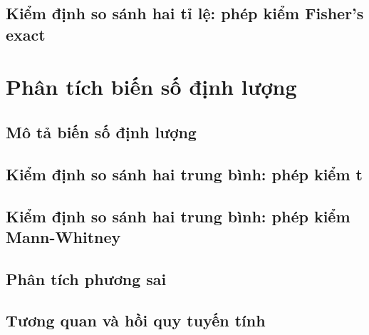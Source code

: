 \documentclass[
]{book}
\begin{document}
\hypertarget{kiux1ec3m-ux111ux1ecbnh-so-suxe1nh-hai-tux1ec9-lux1ec7-phuxe9p-kiux1ec3m-fishers-exact}{%
\subsection{Kiểm định so sánh hai tỉ lệ: phép kiểm Fisher's exact}\label{kiux1ec3m-ux111ux1ecbnh-so-suxe1nh-hai-tux1ec9-lux1ec7-phuxe9p-kiux1ec3m-fishers-exact}}

\hypertarget{phuxe2n-tuxedch-biux1ebfn-sux1ed1-ux111ux1ecbnh-lux1b0ux1ee3ng}{%
\section{Phân tích biến số định lượng}\label{phuxe2n-tuxedch-biux1ebfn-sux1ed1-ux111ux1ecbnh-lux1b0ux1ee3ng}}

\hypertarget{muxf4-tux1ea3-biux1ebfn-sux1ed1-ux111ux1ecbnh-lux1b0ux1ee3ng}{%
\subsection{Mô tả biến số định lượng}\label{muxf4-tux1ea3-biux1ebfn-sux1ed1-ux111ux1ecbnh-lux1b0ux1ee3ng}}

\hypertarget{kiux1ec3m-ux111ux1ecbnh-so-suxe1nh-hai-trung-buxecnh-phuxe9p-kiux1ec3m-t}{%
\subsection{Kiểm định so sánh hai trung bình: phép kiểm t}\label{kiux1ec3m-ux111ux1ecbnh-so-suxe1nh-hai-trung-buxecnh-phuxe9p-kiux1ec3m-t}}

\hypertarget{kiux1ec3m-ux111ux1ecbnh-so-suxe1nh-hai-trung-buxecnh-phuxe9p-kiux1ec3m-mann-whitney}{%
\subsection{Kiểm định so sánh hai trung bình: phép kiểm Mann-Whitney}\label{kiux1ec3m-ux111ux1ecbnh-so-suxe1nh-hai-trung-buxecnh-phuxe9p-kiux1ec3m-mann-whitney}}

\hypertarget{phuxe2n-tuxedch-phux1b0ux1a1ng-sai}{%
\subsection{Phân tích phương sai}\label{phuxe2n-tuxedch-phux1b0ux1a1ng-sai}}

\hypertarget{tux1b0ux1a1ng-quan-vuxe0-hux1ed3i-quy-tuyux1ebfn-tuxednh}{%
\subsection{Tương quan và hồi quy tuyến tính}\label{tux1b0ux1a1ng-quan-vuxe0-hux1ed3i-quy-tuyux1ebfn-tuxednh}}
\end{document}
